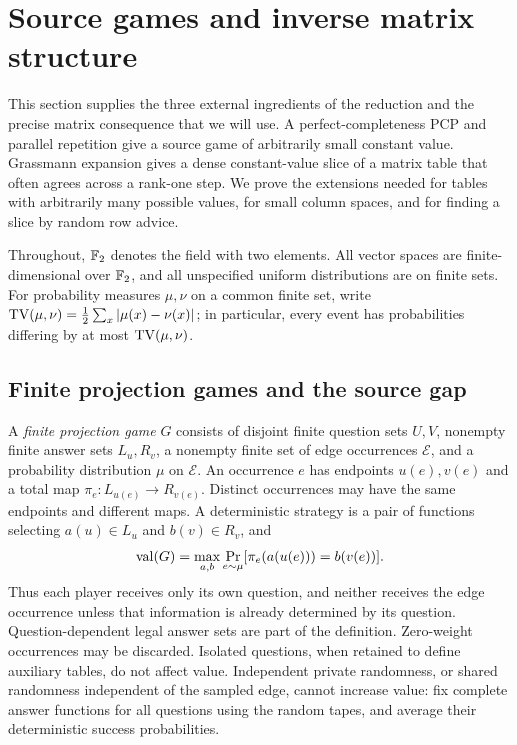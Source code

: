 \section{Source games and inverse matrix structure}
\label{sec:preliminaries}

This section supplies the three external ingredients of the reduction and
the precise matrix consequence that we will use.  A perfect-completeness
PCP and parallel repetition give a source game of arbitrarily small
constant value.  Grassmann expansion gives a dense constant-value slice
of a matrix table that often agrees across a rank-one step.  We prove
the extensions needed for tables with arbitrarily many possible values,
for small column spaces, and for finding a slice by random row advice.

Throughout, $\mathbb F_2$ denotes the field with two elements.  All vector spaces are finite-dimensional
over $\mathbb F_2$, and all unspecified uniform distributions are on finite sets.
For probability measures $\mu,\nu$ on a common finite set, write
$\operatorname{TV}(\mu,\nu)=\frac12\sum_x|\mu(x)-\nu(x)|$; in particular, every event
has probabilities differing by at most $\operatorname{TV}(\mu,\nu)$.

\subsection{Finite projection games and the source gap}

A \emph{finite projection game} $G$ consists of disjoint finite question
sets $U,V$, nonempty finite answer sets $L_u,R_v$, a nonempty finite set
of edge occurrences $\mathcal E$, and a probability distribution $\mu$
on $\mathcal E$.  An occurrence $e$ has endpoints $u(e),v(e)$ and a
total map $\pi_e:L_{u(e)}\to R_{v(e)}$.  Distinct occurrences may have
the same endpoints and different maps.  A deterministic strategy is a
pair of functions selecting $a(u)\in L_u$ and $b(v)\in R_v$, and
\[
 \operatorname{val}(G)=\max_{a,b}\Pr_{e\sim\mu}
       [\pi_e(a(u(e)))=b(v(e))].
\]
Thus each player receives only its own question, and neither receives
the edge occurrence unless that information is already determined by
its question.  Question-dependent legal answer sets are part of the
definition.  Zero-weight occurrences may be discarded.  Isolated
questions, when retained to define auxiliary tables, do not affect value.
Independent private randomness, or shared randomness independent of the
sampled edge, cannot increase value: fix complete answer functions for
all questions using the random tapes, and average their deterministic
success probabilities.

